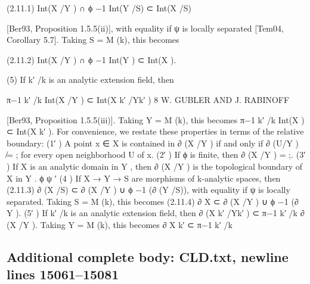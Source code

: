 \documentclass[
  10pt,
]{article}
\newenvironment{Shaded}{}{}
\newcommand{\NormalTok}[1]{#1}
\begin{document}
\begin{Shaded}
\begin{Highlighting}[]
\NormalTok{(2.11.1)                   Int(X /Y ) ∩ ϕ −1 Int(Y /S) ⊂ Int(X /S)}

\NormalTok{        [Ber93, Proposition 1.5.5(ii)], with equality if ψ is locally separated [Tem04,}
\NormalTok{        Corollary 5.7]. Taking S = M (k), this becomes}

\NormalTok{(2.11.2)                      Int(X /Y ) ∩ ϕ −1 Int(Y ) ⊂ Int(X ).}

\NormalTok{   (5) If k′ /k is an analytic extension field, then}

\NormalTok{                                π−1}
\NormalTok{                                 k′ /k}
\NormalTok{                                       Int(X /Y ) ⊂ Int(X k′ /Yk′ )}
\NormalTok{8                                      W. GUBLER AND J. RABINOFF}

\NormalTok{         [Ber93, Proposition 1.5.5(iii)]. Taking Y = M (k), this becomes}
\NormalTok{                                       π−1}
\NormalTok{                                        k′ /k}
\NormalTok{                                              Int(X ) ⊂ Int(X k′ ).}
\NormalTok{For convenience, we restate these properties in terms of the relative boundary:}
\NormalTok{   (1′ ) A point x ∈ X is contained in ∂ (X /Y ) if and only if ∂ (U/Y ) ̸= ; for every open}
\NormalTok{         neighborhood U of x.}
\NormalTok{   (2′ ) If ϕ is finite, then ∂ (X /Y ) = ;.}
\NormalTok{   (3′ ) If X is an analytic domain in Y , then ∂ (X /Y ) is the topological boundary of X}
\NormalTok{         in Y .}
\NormalTok{               ϕ     ψ}
\NormalTok{     ′}
\NormalTok{   (4 ) If X → Y → S are morphisms of k{-}analytic spaces, then}
\NormalTok{(2.11.3)                        ∂ (X /S) ⊂ ∂ (X /Y ) ∪ ϕ −1 (∂ (Y /S)),}
\NormalTok{         with equality if ψ is locally separated. Taking S = M (k), this becomes}
\NormalTok{(2.11.4)                             ∂ X ⊂ ∂ (X /Y ) ∪ ϕ −1 (∂ Y ).}
\NormalTok{    (5′ ) If k′ /k is an analytic extension field, then}
\NormalTok{                                     ∂ (X k′ /Yk′ ) ⊂ π−1}
\NormalTok{                                                       k′ /k}
\NormalTok{                                                             ∂ (X /Y ).}
\NormalTok{         Taking Y = M (k), this becomes}
\NormalTok{                                           ∂ X k′ ⊂ π−1}
\NormalTok{                                                     k′ /k}
\end{Highlighting}
\end{Shaded}

\subsection{Additional complete body: CLD.txt, newline lines
15061--15081}\label{additional-complete-body-cld.txt-newline-lines-1506115081}
\end{document}
